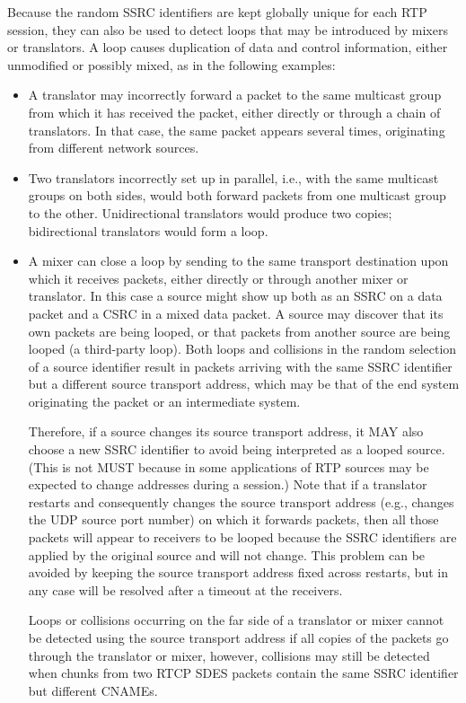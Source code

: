 \documentclass{article}
\begin{document}
Because the random SSRC identifiers are kept globally unique for each RTP session, they can also be used to detect loops that may be introduced by mixers or translators.  A loop causes duplication of data and control information, either unmodified or possibly mixed, as in the following examples:

\begin{itemize}
\item A translator may incorrectly forward a packet to the same multicast group from which it has received the packet, either directly or through a chain of translators.  In that case, the same packet appears several times, originating from different network sources.
\item Two translators incorrectly set up in parallel, i.e., with the same multicast groups on both sides, would both forward packets from one multicast group to the other.  Unidirectional translators would produce two copies; bidirectional translators would form a loop.
\item A mixer can close a loop by sending to the same transport destination upon which it receives packets, either directly or through another mixer or translator.  In this case a source might show up both as an SSRC on a data packet and a CSRC in a mixed data packet.
A source may discover that its own packets are being looped, or that packets from another source are being looped (a third-party loop). Both loops and collisions in the random selection of a source identifier result in packets arriving with the same SSRC identifier but a different source transport address, which may be that of the end system originating the packet or an intermediate system.

Therefore, if a source changes its source transport address, it MAY also choose a new SSRC identifier to avoid being interpreted as a looped source.  (This is not MUST because in some applications of RTP sources may be expected to change addresses during a session.)  Note that if a translator restarts and consequently changes the source transport address (e.g., changes the UDP source port number) on which it forwards packets, then all those packets will appear to receivers to be looped because the SSRC identifiers are applied by the original source and will not change.  This problem can be avoided by keeping the source transport address fixed across restarts, but in any case will be resolved after a timeout at the receivers.

Loops or collisions occurring on the far side of a translator or mixer cannot be detected using the source transport address if all copies of the packets go through the translator or mixer, however, collisions may still be detected when chunks from two RTCP SDES packets contain the same SSRC identifier but different CNAMEs.


\end{itemize}
\end{document}

